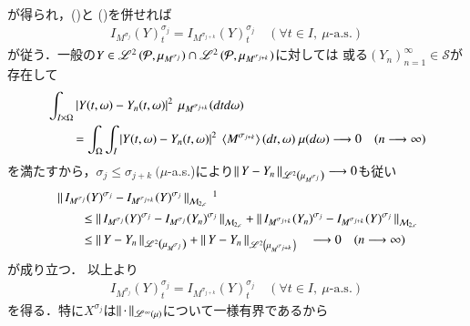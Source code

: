 \begin{prf}
\begin{description}
\begin{align}
					\label{eq:thm_Ito_integral_on_M_c_loc_and_left_cont_locally_bounded_2}
				\end{align}
				が得られ，()と
				()を併せれば
				\begin{align}
					I_{M^{\sigma_j}}(Y)^{\sigma_j}_t = I_{M^{\sigma_{j+k}}}(Y)^{\sigma_j}_t
					\quad (\forall t \in I,\ \mbox{$\mu$-a.s.})
				\end{align}
				が従う．一般の$Y \in \mathscr{L}^{2} \left(\mathcal{P},\mu_{M^{\sigma_j}}\right) \cap \mathscr{L}^{2} \left(\mathcal{P},\mu_{M^{\sigma_{j+k}}}\right)$に対しては
				或る$(Y_n)_{n=1}^{\infty} \in \mathcal{S}$が存在して
				\begin{align}
					&\int_{I \times \Omega} \left| Y(t,\omega) - Y_n(t,\omega) \right|^2\ \mu_{M^{\sigma_{j+k}}}(dtd\omega) \\
					&\qquad = \int_{\Omega} \int_I \left| Y(t,\omega) - Y_n(t,\omega) \right|^2\ \inprod<M^{\sigma_{j+k}}>(dt,\omega)\ \mu(d\omega)
					\longrightarrow 0
					\quad (n \longrightarrow \infty)
				\end{align}
				を満たすから，$\sigma_j \leq \sigma_{j+k}\ (\mu$-a.s.)により$\left\|\, Y - Y_n\, \right\|_{\mathscr{L}^{2} \left(\mu_{M^{\sigma_j}}\right)} \longrightarrow 0$も従い
				\begin{align}
					&\Norm{I_{M^{\sigma_j}}(Y)^{\sigma_j} - I_{M^{\sigma_{j+k}}}(Y)^{\sigma_j}}{\mathcal{M}_{2,c}}\ \footnotemark\\
					&\qquad \leq \Norm{I_{M^{\sigma_j}}(Y)^{\sigma_j} - I_{M^{\sigma_j}}(Y_n)^{\sigma_j}}{\mathcal{M}_{2,c}}
						+ \Norm{I_{M^{\sigma_{j+k}}}(Y_n)^{\sigma_j} - I_{M^{\sigma_{j+k}}}(Y)^{\sigma_j}}{\mathcal{M}_{2,c}} \\
					&\qquad \leq \Norm{Y - Y_n}{\semiLp{2}{\mu_{M^{\sigma_j}}}} + \Norm{Y - Y_n}{\semiLp{2}{\mu_{M^{\sigma_{j+k}}}}}
					\quad \longrightarrow 0 \quad (n \longrightarrow \infty)
				\end{align}
				が成り立つ．
				以上より
				\begin{align}
					I_{M^{\sigma_j}}(Y)^{\sigma_j}_t = I_{M^{\sigma_{j+k}}}(Y)^{\sigma_j}_t
					\quad (\forall t \in I,\ \mbox{$\mu$-a.s.})
					\label{eq:thm_Ito_integral_on_M_c_loc_and_left_cont_locally_bounded_3}
				\end{align}
				を得る．特に$X^{\sigma_j}$は$\left\|\, \cdot\, \right\|_{\mathscr{L}^{\infty} \left(\mu\right)}$について一様有界であるから

\end{description}
\end{prf}
